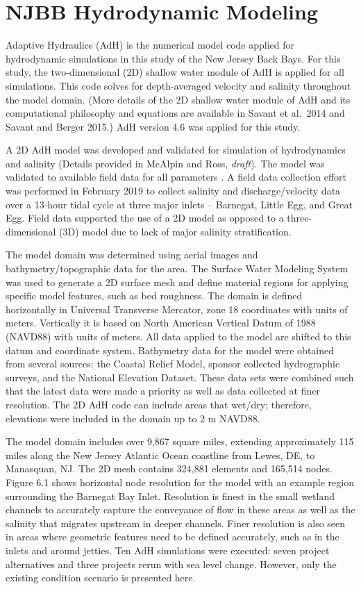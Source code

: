 \documentclass[
]{book}
\begin{document}
\hypertarget{njbb-hydrodynamic-modeling}{%
\section{NJBB Hydrodynamic Modeling}\label{njbb-hydrodynamic-modeling}}

Adaptive Hydraulics (AdH) is the numerical model code applied for hydrodynamic simulations in this study of the New Jersey Back Bays. For this study, the two-dimensional (2D) shallow water module of AdH is applied for all simulations. This code solves for depth-averaged velocity and salinity throughout the model domain. (More details of the 2D shallow water module of AdH and its computational philosophy and equations are available in Savant et al.~2014 and Savant and Berger 2015.) AdH version 4.6 was applied for this study.

A 2D AdH model was developed and validated for simulation of hydrodynamics and salinity (Details provided in McAlpin and Ross, \emph{draft}). The model was validated to available field data for all parameters . A field data collection effort was performed in February 2019 to collect salinity and discharge/velocity data over a 13-hour tidal cycle at three major inlets -- Barnegat, Little Egg, and Great Egg. Field data supported the use of a 2D model as opposed to a three-dimensional (3D) model due to lack of major salinity stratification.

The model domain was determined using aerial images and bathymetry/topographic data for the area. The Surface Water Modeling System was used to generate a 2D surface mesh and define material regions for applying specific model features, such as bed roughness. The domain is defined horizontally in Universal Transverse Mercator, zone 18 coordinates with units of meters. Vertically it is based on North American Vertical Datum of 1988 (NAVD88) with units of meters. All data applied to the model are shifted to this datum and coordinate system. Bathymetry data for the model were obtained from several sources: the Coastal Relief Model, sponsor collected hydrographic surveys, and the National Elevation Dataset. These data sets were combined such that the latest data were made a priority as well as data collected at finer resolution. The 2D AdH code can include areas that wet/dry; therefore, elevations were included in the domain up to 2 m NAVD88.

The model domain includes over 9,867 square miles, extending approximately 115 miles along the New Jersey Atlantic Ocean coastline from Lewes, DE, to Manasquan, NJ. The 2D mesh contains 324,881 elements and 165,514 nodes. Figure 6.1 shows horizontal node resolution for the model with an example region surrounding the Barnegat Bay Inlet. Resolution is finest in the small wetland channels to accurately capture the conveyance of flow in these areas as well as the salinity that migrates upstream in deeper channels. Finer resolution is also seen in areas where geometric features need to be defined accurately, such as in the inlets and around jetties. Ten AdH simulations were executed: seven project alternatives and three projects rerun with sea level change. However, only the existing condition scenario is presented here.
\end{document}
